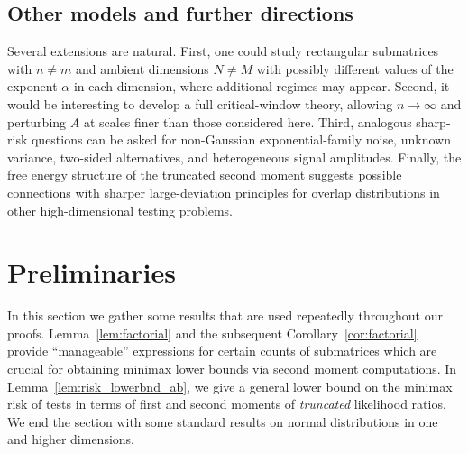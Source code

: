 \documentclass[11pt,reqno,letterpaper]{amsart}
\numberwithin{equation}{section}
\theoremstyle{plain}
\begin{document}
\subsection{Other models and further directions}\label{subsec:directions}
Several extensions are natural. First, one could study rectangular submatrices with $n\ne m$ and ambient dimensions $N\ne M$ with possibly different values of the exponent $\alpha$ in each dimension, where additional regimes may appear.  Second, it would be interesting to develop a full critical-window theory, allowing $n\to\infty$ and perturbing $A$ at scales finer than those considered here.  Third, analogous sharp-risk questions can be asked for non-Gaussian exponential-family noise, unknown variance, two-sided alternatives, and heterogeneous signal amplitudes.  Finally, the free energy structure of the truncated second moment suggests possible connections with sharper large-deviation principles for overlap distributions in other high-dimensional testing problems.

\section{Preliminaries}\label{sec:prelim}
In this section we gather some results that are used repeatedly throughout our 
proofs. Lemma~\ref{lem:factorial} and the subsequent Corollary~\ref{cor:factorial} 
provide ``manageable'' expressions for certain counts of submatrices %
which are crucial for obtaining minimax lower bounds via second moment 
computations. In Lemma~\ref{lem:risk_lowerbnd_ab}, we give a general lower bound 
on the minimax risk of tests in terms of first and second moments of {\em truncated} likelihood ratios. We end the section with some standard results on 
normal distributions in one and higher dimensions.

\smallskip
\end{document}
